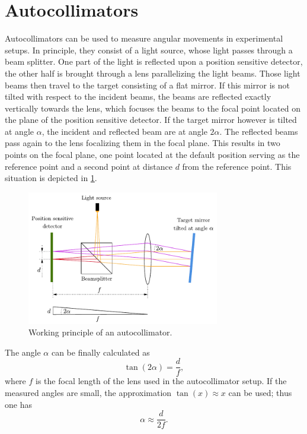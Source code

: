 \documentclass{report}
\numberwithin{tm}{section}
\begin{document}
\section{Autocollimators}
Autocollimators can be used to measure angular movements in experimental setups. In principle, they consist of a light source, whose light passes through a beam splitter. One part of the light is reflected upon a position sensitive detector, the other half is brought through a lens parallelizing the light beams. Those light beams then travel to the target consisting of a flat mirror. If this mirror is not tilted with respect to the incident beams, the beams are reflected exactly vertically towards the lens, which focuses the beams to the focal point located on the plane of the position sensitive detector. If the target mirror however is tilted at angle $\alpha$, the incident and reflected beam are at angle $2\alpha$. The reflected beams pass again to the lens focalizing them in the focal plane. This results in two points on the focal plane, one point located at the default position serving as the reference point and a second point at distance $d$ from the reference point. This situation is depicted in \cref{fig:autocollimator}.
\begin{figure}[h]
	 \centering
	 \includegraphics[width=0.75\textwidth]{figures/autocollimator.pdf}
	 \caption{Working principle of an autocollimator.}
	 \label{fig:autocollimator}
\end{figure}
The angle $\alpha$ can be finally calculated as \begin{equation}
	\tan(2\alpha) = \frac{d}{f},
\end{equation} where $f$ is the focal length of the lens used in the autocollimator setup. If the measured angles are small, the approximation $\tan(x) \approx x$ can be used; thus one has \begin{equation}
\alpha \approx \frac{d}{2f}.
\end{equation}
\end{document}
